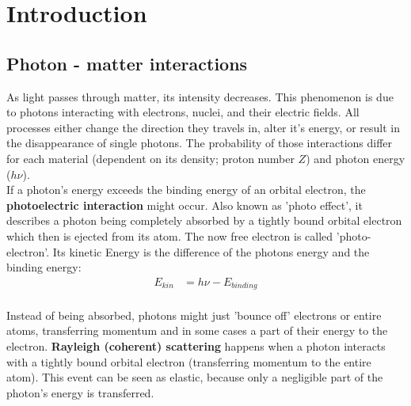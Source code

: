 \chapter{Introduction}
\label{chap:intro}

\section{Photon - matter interactions}
\label{sec:photon}

As light passes through matter, its intensity decreases.
This phenomenon is due to photons interacting with electrons, nuclei, and their electric fields.
All processes either change the direction they travels in, alter it's energy, or result in the disappearance of single photons.
The probability of those interactions differ for each material (dependent on its density; proton number $Z$) and photon energy ($h\nu$). \\

If a photon's energy exceeds the binding energy of an orbital electron, the \textbf{photoelectric interaction} might occur.
Also known as 'photo effect', it describes a photon being completely absorbed by a tightly bound orbital electron which then is ejected from its atom.
The now free electron is called 'photo-electron'. Its kinetic Energy is the difference of the photons energy and the binding energy:
\begin{align}
E_{kin} &= h\nu - E_{binding}
\end{align} \\

Instead of being absorbed, photons might just 'bounce off' electrons or entire atoms, transferring momentum and in some cases a part of their energy to the electron.
\textbf{Rayleigh (coherent) scattering} happens when a photon interacts with a tightly bound orbital electron (transferring momentum to the entire atom).
This event can be seen as elastic, because only a negligible part of the photon's energy is transferred.


